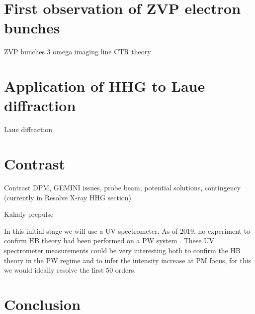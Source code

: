 \section{First observation of ZVP electron bunches}



ZVP bunches 
3 omega imaging line
CTR theory


\section{Application of HHG to Laue diffraction}
Laue diffraction



\section{Contrast}

Contrast DPM, GEMINI issues, probe beam, potential solutions, contingency (currently in Resolve X-ray HHG section)

Kahaly prepulse


In this initial stage we will use a UV spectrometer. As of 2019, no experiment to confirm HB theory had been performed on a PW system \cite{vincentiAchievingExtremeLight2019}. These UV spectrometer measurements could be very interesting both to confirm the HB theory in the PW regime and to infer the intensity increase at PM focus, for this we would ideally resolve the first 50 orders.
\section{Conclusion}




